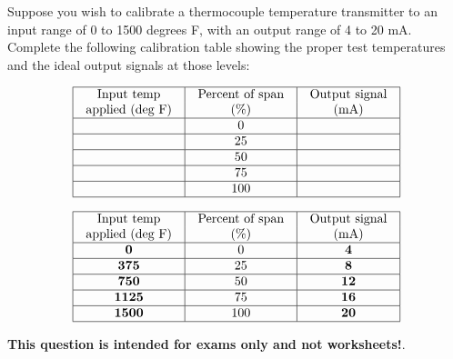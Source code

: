 

Suppose you wish to calibrate a thermocouple temperature transmitter to an input range of 0 to 1500 degrees F, with an output range of 4 to 20 mA.  Complete the following calibration table showing the proper test temperatures and the ideal output signals at those levels:


$$\vbox{\offinterlineskip
\halign{\strut
\vrule \quad\hfil # \ \hfil & 
\vrule \quad\hfil # \ \hfil & 
\vrule \quad\hfil # \ \hfil \vrule \cr
\noalign{\hrule}
%
Input temp & Percent of span & Output signal \cr
%
applied (deg F) & (\%) & (mA) \cr
%
\noalign{\hrule}
%
 & 0 &  \cr
%
\noalign{\hrule}
%
 & 25 &  \cr
%
\noalign{\hrule}
%
 & 50 &  \cr
%
\noalign{\hrule}
%
 & 75 &  \cr
%
\noalign{\hrule}
%
 & 100 &  \cr
%
\noalign{\hrule}
} %
}$$ %








$$\vbox{\offinterlineskip
\halign{\strut
\vrule \quad\hfil # \ \hfil & 
\vrule \quad\hfil # \ \hfil & 
\vrule \quad\hfil # \ \hfil \vrule \cr
\noalign{\hrule}
%
Input temp & Percent of span & Output signal \cr
%
applied (deg F) & (\%) & (mA) \cr
%
\noalign{\hrule}
%
{\bf 0} & 0 & {\bf 4} \cr
%
\noalign{\hrule}
%
{\bf 375} & 25 & {\bf 8} \cr
%
\noalign{\hrule}
%
{\bf 750} & 50 & {\bf 12} \cr
%
\noalign{\hrule}
%
{\bf 1125} & 75 & {\bf 16} \cr
%
\noalign{\hrule}
%
{\bf 1500} & 100 & {\bf 20} \cr
%
\noalign{\hrule}
} %
}$$ %







{\bf This question is intended for exams only and not worksheets!}.




